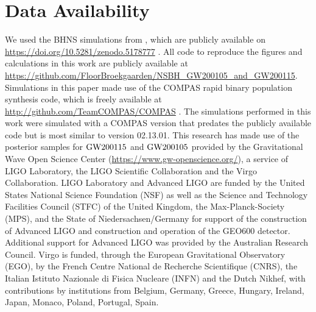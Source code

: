 \documentclass{aastex63}
\newcommand{\gwone}{\ensuremath{\rm{GW200115}}\xspace}
\newcommand{\gwzero}{\ensuremath{\rm{GW200105}}\xspace}
\begin{document}
\section*{Data Availability}
%
We used the \ac{BHNS} simulations from \citet{BroekgaardenDCOmergers:2021}, which are publicly available on \url{https://doi.org/10.5281/zenodo.5178777} \citep{ZenodoDCOBHNS:2021}.  
All code to reproduce the figures and calculations in this work are publicly available at \url{https://github.com/FloorBroekgaarden/NSBH_GW200105_and_GW200115}. Simulations in this paper made use of the COMPAS rapid binary population synthesis code, which is freely available at \url{http://github.com/TeamCOMPAS/COMPAS} \citep{stevenson2017formation,Barrett:2017,VignaGomez:2018,Broekgaarden:2019, Neijssel:2019}. The simulations performed in this work were simulated with a COMPAS version that predates the publicly available code but is most similar to version 02.13.01. This research has made use of the posterior samples for \gwone and \gwzero provided by the Gravitational Wave Open Science Center (\url{https://www.gw-openscience.org/}), a service of LIGO Laboratory, the LIGO Scientific Collaboration and the Virgo Collaboration. LIGO Laboratory and Advanced LIGO are funded by the United States National Science Foundation (NSF) as well as the Science and Technology Facilities Council (STFC) of the United Kingdom, the Max-Planck-Society (MPS), and the State of Niedersachsen/Germany for support of the construction of Advanced LIGO and construction and operation of the GEO600 detector. Additional support for Advanced LIGO was provided by the Australian Research Council. Virgo is funded, through the European Gravitational Observatory (EGO), by the French Centre National de Recherche Scientifique (CNRS), the Italian Istituto Nazionale di Fisica Nucleare (INFN) and the Dutch Nikhef, with contributions by institutions from Belgium, Germany, Greece, Hungary, Ireland, Japan, Monaco, Poland, Portugal, Spain.






{} %







\end{document}
